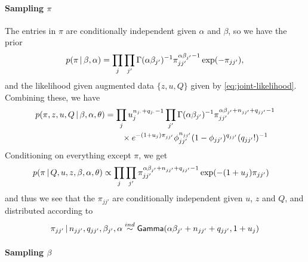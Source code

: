 \paragraph{Sampling $\pi$}

The entries in $\pi$ are conditionally independent given $\alpha$ and
$\beta$, so we have the prior
\begin{equation}
  \label{eq:47} p(\pi \, \vert \, \beta, \alpha) = \prod_{j} \prod_{j'}
\Gamma(\alpha\beta_{j'})^{-1} \pi_{jj'}^{\alpha\beta_{j'} - 1}
\exp(-\pi_{jj'}),
\end{equation} and the likelihood given augmented data $\{z, u, Q\}$
given by \eqref{eq:joint-likelihood}.  Combining these, we have
\begin{align}
  \label{eq:61} p(\pi, z, u, Q \, \vert \, \beta, \alpha, \theta) &=
\prod_{j} u_j^{n_{j\cdot} + q_{j\cdot} - 1}\prod_{j'}
\Gamma(\alpha\beta_{j'})^{-1} \pi_{jj'}^{\alpha\beta_{j'} + n_{jj'} +
q_{jj'} - 1} \\&\qquad \times e^{-(1 + u_j) \pi_{jj'}}
\phi_{jj'}^{n_{jj'}} (1-\phi_{jj'})^{q_{jj'}} (q_{jj'}!)^{-1}
\end{align} Conditioning on everything except $\pi$, we get
\begin{align}
  \label{eq:24} p(\pi \, \vert \, Q, u, z, \beta, \alpha, \theta) &\propto
\prod_j \prod_{j'} \pi_{jj'}^{\alpha\beta_{j'} + n_{jj'} + q_{jj'} -
1} \exp(-(1 + u_j)\pi_{jj'})
\end{align} and thus we see that the $\pi_{jj'}$ are conditionally
independent given $u$, $z$ and $Q$, and distributed according to
\begin{align}
  \label{eq:25} \pi_{jj'} \, \vert \, n_{jj'}, q_{jj'}, \beta_{j'}, \alpha
\stackrel{ind}{\sim} \mathsf{Gamma}(\alpha\beta_{j'} + n_{jj'} + q_{jj'},1 +
u_j)
\end{align}


\paragraph{Sampling $\beta$}
\label{sec:sampling-bbeta}

